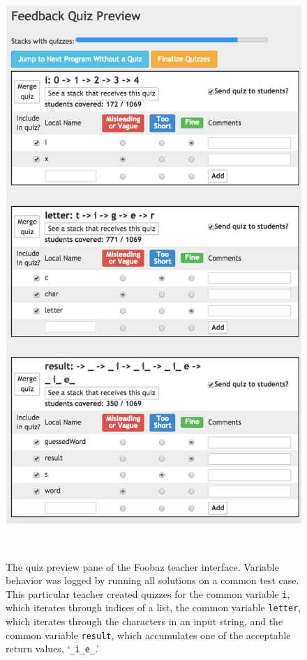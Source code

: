 \begin{figure}
\begin{minipage}{1\columnwidth}
\centering
\includegraphics[width=0.7\columnwidth]{Body/figures/foobaz/quizPreviewHangman.png}
\caption{The quiz preview pane of the Foobaz teacher interface. Variable behavior was logged by running all solutions on a common test case. This particular teacher created quizzes for the common variable \texttt{i}, which iterates through indices of a list, the common variable \texttt{letter}, which iterates through the characters in an input string, and the common variable \texttt{result}, which accumulates one of the acceptable return values, `\texttt{\_i\_e\_}.'}~\label{fig:figure3}
\end{minipage}
\end{figure}

